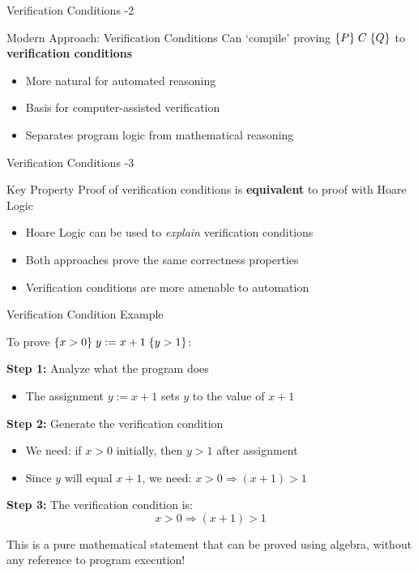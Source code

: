 \begin{frame}{Verification Conditions -2}

        \begin{block}{Modern Approach: Verification Conditions}
        Can `compile' proving $\{P\}\; C\; \{Q\}$ to \textbf{verification conditions}
        \begin{itemize}
            \item More natural for automated reasoning
            \item Basis for computer-assisted verification
            \item Separates program logic from mathematical reasoning
        \end{itemize}
    \end{block}
\end{frame}

\begin{frame}{Verification Conditions -3}
    \begin{block}{Key Property}
        Proof of verification conditions is \textbf{equivalent} to proof with Hoare Logic
        \begin{itemize}
            \item Hoare Logic can be used to \emph{explain} verification conditions
            \item Both approaches prove the same correctness properties
            \item Verification conditions are more amenable to automation
        \end{itemize}
    \end{block}
\end{frame}

\begin{frame}{Verification Condition Example}
    \begin{example}
        To prove $\{x > 0\}\; y := x + 1\; \{y > 1\}$:
        
        \textbf{Step 1:} Analyze what the program does
        \begin{itemize}
            \item The assignment $y := x + 1$ sets $y$ to the value of $x + 1$
        \end{itemize}
        
        \textbf{Step 2:} Generate the verification condition
        \begin{itemize}
            \item We need: if $x > 0$ initially, then $y > 1$ after assignment
            \item Since $y$ will equal $x + 1$, we need: $x > 0 \Rightarrow (x + 1) > 1$
        \end{itemize}
        
        \textbf{Step 3:} The verification condition is:
        \[x > 0 \Rightarrow (x + 1) > 1\]
        
        This is a pure mathematical statement that can be proved using algebra, without any reference to program execution!
    \end{example}
\end{frame}